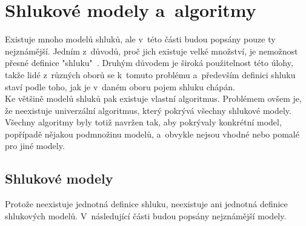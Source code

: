 
\section{Shlukové modely a~algoritmy} \label{sec:clustermodels}
Existuje mnoho modelů shluků, ale v~této části budou popsány pouze ty nejznámější. Jedním z~důvodů, proč jich existuje velké množství, je nemožnost přesné definice "shluku"~\cite{EstivillCastro02}. Druhým důvodem je široká použitelnost této úlohy, takže lidé z~různých oborů se k~tomuto problému a~především definici shluku staví podle toho, jak je v~daném oboru pojem shluku chápán.\\

Ke většině modelů shluků pak existuje vlastní algoritmus. Problémem ovšem je, že neexistuje univerzální algoritmus, který pokrývá všechny shlukové modely. Všechny algoritmy byly totiž navržen tak, aby pokrývaly konkrétní model, popřípadě nějakou podmnožinu modelů, a~obvykle nejsou vhodné nebo pomalé pro jiné modely.

\subsection{Shlukové modely}
Protože neexistuje jednotná definice shluku, neexistuje ani jednotná definice shlu\-ko\-vý\-ch modelů. V~následující části budou popsány nejznámější modely.


